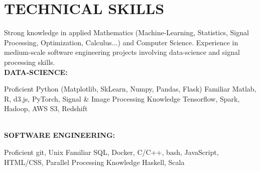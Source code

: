 \documentclass[]{cv-style}
\begin{document}
\section{TECHNICAL SKILLS}
\vspace{-0.25cm}
%
Strong knowledge in applied Mathematics (Machine-Learning, Statistics, Signal 
Processing, Optimization, Calculus...) and Computer Science. Experience in 
medium-scale software engineering projects involving data-science and signal 
processing skills. \\[0.15cm] 
\textbf{DATA-SCIENCE:} \\[0.15cm]
\begin{entrylist}
%
\entry
{Proficient}
{{\normalfont Python (Matplotlib, SkLearn, Numpy, Pandas, Flask)}}
{}{\vspace{-0.5cm}}
%
\entry
{Familiar}
{{\normalfont Matlab, R, d3.js, PyTorch, Signal \& Image Processing}}
{}{\vspace{-0.5cm}}
%
\entry
{Knowledge}
{{\normalfont Tensorflow, Spark, Hadoop, AWS S3, Redshift}}{}{}
%
\end{entrylist}
\vspace{-0.5cm}\\
\textbf{SOFTWARE ENGINEERING:} \\[0.15cm]
\begin{entrylist}
%
\entry
{Proficient}
{{\normalfont git, Unix}}
{}{\vspace{-0.5cm}}
%
\entry
{Familiar}
{{\normalfont SQL, Docker, C/C++, bash, JavaScript, HTML/CSS, Parallel 
Processing}}
{}{\vspace{-0.5cm}}
%
\entry
{Knowledge}
{{\normalfont Haskell, Scala}}
{}{\vspace{-0.5cm}}
%
\end{entrylist}
\end{document}
